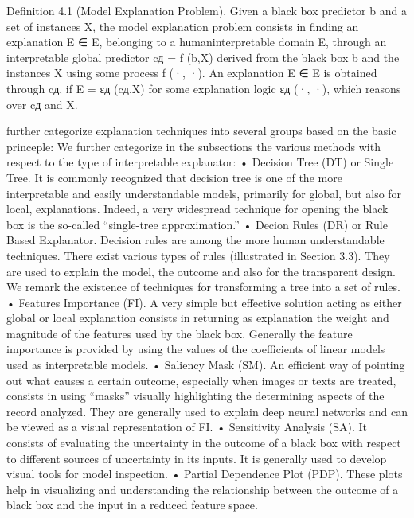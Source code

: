 \cite{Guidotti2018} 
Definition 4.1 (Model Explanation Problem). Given a black box predictor b and a set of instances
X, the model explanation problem consists in finding an explanation E ∈ E, belonging to a humaninterpretable domain E, through an interpretable global predictor cд = f (b,X) derived from the
black box b and the instances X using some process f (·, ·). An explanation E ∈ E is obtained
through cд, if E = εд (cд,X) for some explanation logic εд (·, ·), which reasons over cд and X.


\citet{Guidotti2018} further categorize explanation techniques into several groups based on the basic princeple:
We further categorize in the subsections the various methods with respect to the type of interpretable explanator:
• Decision Tree (DT) or Single Tree. It is commonly recognized that decision tree is one of
the more interpretable and easily understandable models, primarily for global, but also for
local, explanations. Indeed, a very widespread technique for opening the black box is the
so-called “single-tree approximation.”
• Decion Rules (DR) or Rule Based Explanator. Decision rules are among the more human understandable techniques. There exist various types of rules (illustrated in Section 3.3). They
are used to explain the model, the outcome and also for the transparent design. We remark
the existence of techniques for transforming a tree into a set of rules.
• Features Importance (FI). A very simple but effective solution acting as either global or local
explanation consists in returning as explanation the weight and magnitude of the features
used by the black box. Generally the feature importance is provided by using the values of
the coefficients of linear models used as interpretable models.
• Saliency Mask (SM). An efficient way of pointing out what causes a certain outcome, especially when images or texts are treated, consists in using “masks” visually highlighting the
determining aspects of the record analyzed. They are generally used to explain deep neural
networks and can be viewed as a visual representation of FI.
• Sensitivity Analysis (SA). It consists of evaluating the uncertainty in the outcome of a black
box with respect to different sources of uncertainty in its inputs. It is generally used to
develop visual tools for model inspection.
• Partial Dependence Plot (PDP). These plots help in visualizing and understanding the relationship between the outcome of a black box and the input in a reduced feature space.
